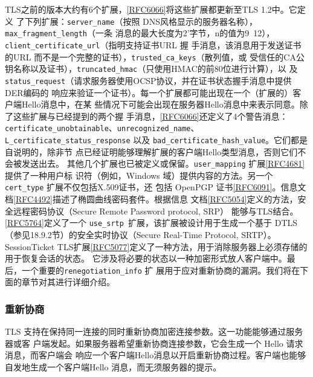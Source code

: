 TLS之前的版本大约有6个扩展，\href{https://www.rfc-editor.org/rfc/rfc6066}{[RFC6066]}将这些扩展都更新至TLS 1.2中。它定义
了下列扩展：\verb|server_name|（按照 DNS风格显示的服务器名称），\verb|max_fragment_length|（一条
消息的最大长度为2'字节，n的值为9~12），\verb|client_certificate_url|（指明支持证书URL 握
手消息，该消息用于发送证书的URL 而不是一个完整的证书），\verb|trusted_ca_keys|（散列值，或
受信任的CA公钥名称以及证书），\verb|truncated_hmac|（只使用HMAC的前80位进行计算），以
及 \verb|status_request|（请求服务器使用OCSP协议，并在证书状态握手消息中提供DER编码的
响应来验证一个证书）。每一个扩展都可能出现在一个（扩展的）客户端Hello消息中，在某
些情况下可能会出现在服务器Hello消息中来表示同意。除了这些扩展与已经提到的两个握
手消息，\href{https://www.rfc-editor.org/rfc/rfc6066}{[RFC6066]}还定义了4个警告消息：\verb|certificate_unobtainable|、\verb|unrecognized_name|、
\verb|L_certificate_status_response| 以及 \verb|bad_certificate_hash_value|。它们都是自说明的，除非节
点已经证明能够理解扩展的客户端Hello类型消息，否则它们不会被发送出去。
其他几个扩展也已被定义或保留。\verb|user_mapping| 扩展\href{https://www.rfc-editor.org/rfc/rfc4681}{[RFC4681]} 提供了一种用户标
识符（例如，Windows 域）提供内容的方法。另一个 \verb|cert_type| 扩展不仅包括X.509证书，还
包括 OpenPGP 证书\href{https://www.rfc-editor.org/rfc/rfc6091}{[RFC6091]}。信息文档\href{https://www.rfc-editor.org/rfc/rfc4492}{[RFC4492]}描述了椭圆曲线密码套件。根据信息
文档\href{https://www.rfc-editor.org/rfc/rfc5054}{[RFC5054]}定义的方法，安全远程密码协议（Secure Remote Password protocol, SRP）
能够与TLS结合。\href{https://www.rfc-editor.org/rfc/rfc5764}{[RFC5764]}定义了一个 \verb|use_srtp |扩展，该扩展被设计用于生成一个基于
DTLS（参见18.9.2节）的安全实时协议（Secure Real-Time Protocol, SRTP）。 SessionTicket
TLS扩展\href{https://www.rfc-editor.org/rfc/rfc5077}{[RFC5077]}定义了一种方法，用于消除服务器上必须存储的用于恢复会话的状态。
它涉及将必要的状态以一种加密形式放人客户端中。最后，一个重要的\verb|renegotiation_info| 扩
展用于应对重新协商的漏洞。我们将在下面的章节对其进行详细介绍。

\subsubsection{重新协商}
TLS 支持在保持同一连接的同时重新协商加密连接参数。这一功能能够通过服务器或客
户端发起。如果服务器希望重新协商连接参数，它会生成一个 Hello 请求消息，而客户端会
响应一个客户端Hello消息以开启重新协商过程。客户端也能够自发地生成一个客户端Hello
消息，而无须服务器的提示。

